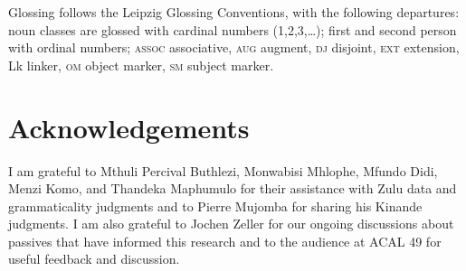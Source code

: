 \documentclass[output=paper,colorlinks,citecolor=brown]{langscibook}
\begin{document}
Glossing follows the Leipzig Glossing Conventions, with the following departures: noun classes are glossed with cardinal numbers (1,2,3,\ldots); first and second person with ordinal numbers; \textsc{assoc} associative, \textsc{aug} augment, \textsc{dj} disjoint, \textsc{ext} extension, Lk linker, \textsc{om} object marker, \textsc{sm} subject marker.

\section*{Acknowledgements}

I am grateful to Mthuli Percival Buthlezi, Monwabisi Mhlophe, Mfundo Didi, Menzi Komo, and Thandeka Maphumulo  for their assistance with Zulu data and grammaticality judgments and to Pierre Mujomba for sharing his Kinande judgments. I am also grateful to Jochen Zeller for our ongoing discussions about passives that have informed this research and to the audience at ACAL 49 for useful feedback and discussion.

\printbibliography[heading=subbibliography,notkeyword=this]
\end{document}
